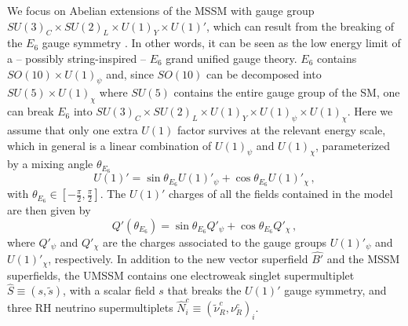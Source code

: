 \documentclass[a4paper,11pt]{article}
\begin{document}
We focus on Abelian extensions of the MSSM with gauge group
$SU(3)_{C}\times SU(2)_{L}\times U(1)_{Y}\times U(1)'$, which can
result from the breaking of the $E_6$ gauge symmetry
\cite{London:1986dk, Hewett:1988xc}. In other words, it can be seen as
the low energy limit of a -- possibly string-inspired -- $E_6$ grand
unified gauge theory. $E_6$ contains $SO(10) \times U(1)_\psi$ and,
since $SO(10)$ can be decomposed into $SU(5)\times U(1)_\chi$ where $SU(5)$ 
contains the entire gauge group of the SM, one can break $E_6$ into
$SU(3)_C \times SU(2)_L \times U(1)_Y \times U(1)_\psi \times
U(1)_\chi$. Here we assume that only one extra $U(1)$ factor survives
at the relevant energy scale, which in general is a linear
combination of $U(1)_\psi$ and $U(1)_\chi$, parameterized
by a mixing angle $\theta_{E_{6}}$ \cite{London:1986dk}
%
\begin{equation} \label{eq 1.1}
U(1)' = \sin \theta_{E_6} U(1)'_\psi + \cos \theta_{E_6} U(1)'_\chi\,,
\end{equation}
%
with $\theta_{E_6} \in [-\frac{\pi}{2},\frac{\pi}{2}]$. The $U(1)'$
charges of all the fields contained in the model are then given by
%
\begin{equation} \label{eq 1.2}
Q'(\theta_{E_6}) = \sin \theta_{E_6} Q'_\psi + \cos \theta_{E_6} Q'_\chi\,,
\end{equation}
%
where $Q'_\psi$ and $Q'_\chi$ are the charges associated to the gauge
groups $U(1)'_\psi$ and $U(1)'_\chi$, respectively. In addition to the
new vector superfield $\hat{B'}$ and the MSSM superfields, the UMSSM
contains one electroweak singlet supermultiplet
$\hat{S}\equiv (s,\tilde{s})$, with a scalar field $s$ that breaks the
$U(1)'$ gauge symmetry, and three RH neutrino supermultiplets
$\hat{N}^{c}_{i}\equiv (\tilde{\nu}_{R}^{c},\nu_{R}^{c})_{i}$.
\end{document}
